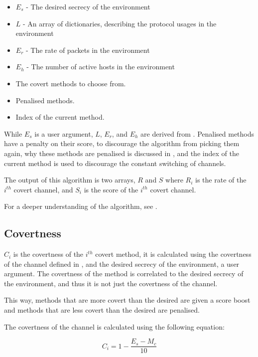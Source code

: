\begin{itemize}
    \item $E_s$ - The desired secrecy of the environment
    \item $L$ - An array of dictionaries, describing the protocol usages in the environment
    \item $E_r$ - The rate of packets in the environment
    \item $E_h$ - The number of active hosts in the environment
    \item The covert methods to choose from.
    \item Penalised methods.
    \item Index of the current method.
\end{itemize}

While $E_s$ is a user argument, $L$, $E_r$, and $E_h$ are derived from . Penalised methods have a penalty on their score, to discourage the algorithm from picking them again, why these methods are penalised is discussed in , and the index of the current method is used to discourage the constant switching of channels.

The output of this algorithm is two arrays, $R$ and $S$ where $R_i$ is the rate of the $i^{th}$ covert channel, and $S_i$ is the score of the $i^{th}$ covert channel.

For a deeper understanding of the algorithm, see .

\subsection{Covertness}

$C_i$ is the covertness of the $i^{th}$ covert method, it is calculated using the covertness of the channel defined in , and the desired secrecy of the environment, a user argument. The covertness of the method is correlated to the desired secrecy of the environment, and thus it is not just the covertness of the channel.

This way, methods that are more covert than the desired are given a score boost and methods that are less covert than the desired are penalised.

The covertness of the channel is calculated using the following equation:

\begin{equation}
    C_i = 1 - \frac{E_s - M_c}{10}
\end{equation}

